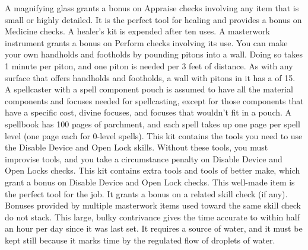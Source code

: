         A magnifying glass grants a  bonus on Appraise checks involving any item that is small or highly detailed.
         It is the perfect tool for healing and provides a  bonus on Medicine checks. A healer's kit is expended after ten uses.
         A masterwork instrument grants a  bonus on Perform checks involving its use.
         You can make your own handholds and footholds by pounding pitons into a wall. Doing so takes 1 minute per piton, and one piton is needed per 3 feet of distance. As with any surface that offers handholds and footholds, a wall with pitons in it has a  of 15.
         A spellcaster with a spell component pouch is assumed to have all the material components and focuses needed for spellcasting, except for those components that have a specific cost, divine focuses, and focuses that wouldn't fit in a pouch.
         A spellbook has 100 pages of parchment, and each spell takes up one page per spell level (one page each for 0-level spells).
         This kit contains the tools you need to use the Disable Device and Open Lock skills. Without these tools, you must improvise tools, and you take a  circumstance penalty on Disable Device and Open Locks checks.
         This kit contains extra tools and tools of better make, which grant a  bonus on Disable Device and Open Lock checks.
         This well-made item is the perfect tool for the job. It grants a  bonus on a related skill check (if any). Bonuses provided by multiple masterwork items used toward the same skill check do not stack.
         This large, bulky contrivance gives the time accurate to within half an hour per day since it was last set. It requires a source of water, and it must be kept still because it marks time by the regulated flow of droplets of water.

